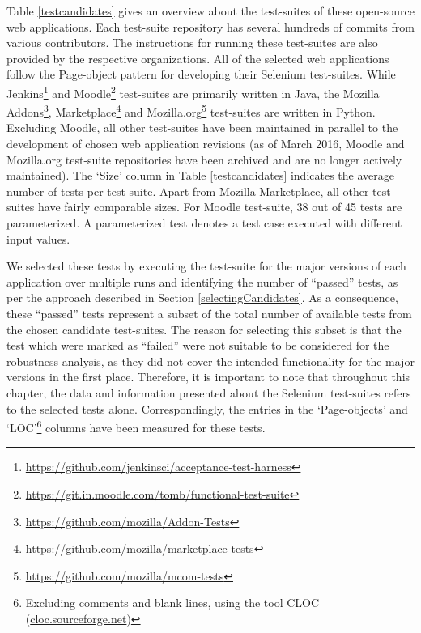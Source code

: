 Table \ref{testcandidates} gives an overview about the test-suites of these open-source web applications. Each test-suite repository has several hundreds of commits from various contributors. The instructions for running these test-suites are also provided by the respective organizations. All of the selected web applications follow the Page-object pattern for developing their Selenium test-suites. While Jenkins\footnote{\url{https://github.com/jenkinsci/acceptance-test-harness}} and Moodle\footnote{\url{https://git.in.moodle.com/tomb/functional-test-suite}} test-suites are primarily written in Java, the Mozilla Addons\footnote{\url{https://github.com/mozilla/Addon-Tests}}, Marketplace{\footnote{\url{https://github.com/mozilla/marketplace-tests}}} and Mozilla.org\footnote{\url{https://github.com/mozilla/mcom-tests}} test-suites are written in Python.
Excluding Moodle, all other test-suites have been maintained in parallel to the development of chosen web application revisions 
(as of March 2016, Moodle and Mozilla.org test-suite repositories have been archived and are no longer actively maintained). The `Size' column in Table \ref{testcandidates} indicates the average number of tests per test-suite. Apart from Mozilla Marketplace, all other test-suites have fairly comparable sizes. For Moodle test-suite, 38 out of 45 tests are parameterized. A parameterized test denotes a test case executed with different input values. 

We selected these tests by executing the test-suite for the major versions of each application over multiple runs and identifying the number of ``passed'' tests, as per the approach described in Section \ref{selectingCandidates}. As a consequence, these ``passed'' tests represent a subset of the total number of available tests from the chosen candidate test-suites. The reason for selecting this subset is that the test which were marked as ``failed'' were not suitable to be considered for the robustness analysis, as they did not cover the intended functionality for the major versions in the first place. 
Therefore, it is important to note that throughout this chapter, the data and information presented about the Selenium test-suites refers to the selected tests alone. Correspondingly, the entries in the `Page-objects' and `LOC'\footnote{Excluding comments and blank lines, using the tool CLOC (\url{cloc.sourceforge.net})} columns have been measured for these tests.

